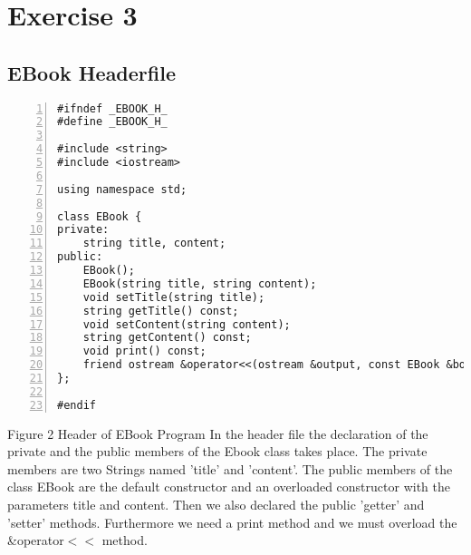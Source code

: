 \documentclass{llncs}
\begin{document}
\section{Exercise 3}
\subsection{EBook Headerfile}

\begin{lstlisting}[basicstyle=\footnotesize\ttfamily, numbers=left, stepnumber=1, numberstyle = \normalsize]
#ifndef _EBOOK_H_
#define _EBOOK_H_

#include <string>
#include <iostream>

using namespace std;

class EBook {
private:
	string title, content; 
public:
	EBook();
	EBook(string title, string content);
	void setTitle(string title);
	string getTitle() const;
	void setContent(string content);
	string getContent() const;
	void print() const;
	friend ostream &operator<<(ostream &output, const EBook &book);
};

#endif

\end{lstlisting}
\scriptsize{Figure 2 Header of EBook Program}\newline
\newline
\newline
In the header file the declaration of the private and the public members of the Ebook class takes place.\newline
The private members are two Strings named 'title' and 'content'.
The public members of the class EBook are the default constructor and an overloaded constructor with the parameters title and content.\newline 
Then we also declared the public 'getter' and 'setter' methods. Furthermore we need a print method and we must overload the \&operator$<<$ method.\newline

\end{document}
